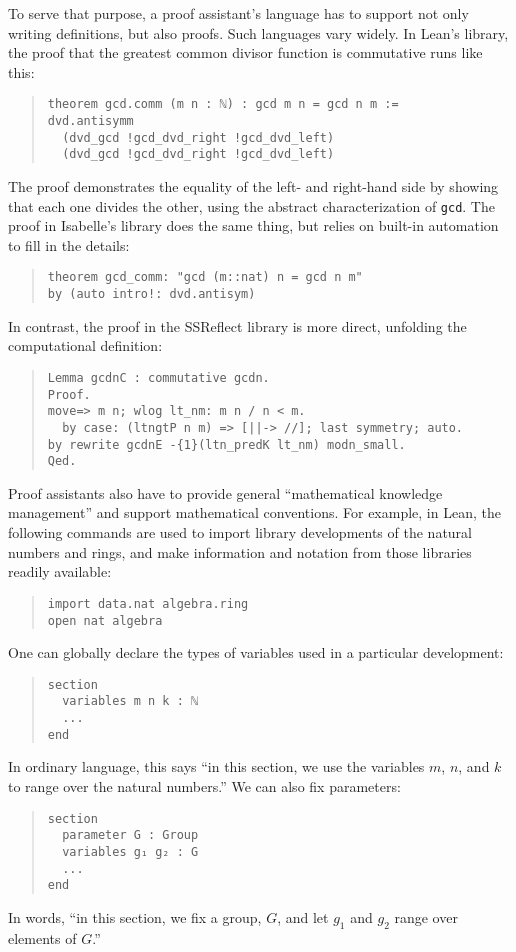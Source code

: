 \documentclass[12pt]{article}
\newcommand{\ttt}[1]{\texttt{#1}}
\begin{document}
To serve that purpose, a proof assistant's language has to support not only writing definitions, but also proofs. Such languages vary widely. In Lean's library, the proof that the greatest common divisor function is commutative runs like this:
\begin{quote}\begin{lstlisting}
theorem gcd.comm (m n : ℕ) : gcd m n = gcd n m :=
dvd.antisymm
  (dvd_gcd !gcd_dvd_right !gcd_dvd_left)
  (dvd_gcd !gcd_dvd_right !gcd_dvd_left) 
\end{lstlisting}\end{quote}
The proof demonstrates the equality of the left- and right-hand side by showing that each one divides the other, using the abstract characterization of \ttt{gcd}. The proof in Isabelle's library does the same thing, but relies on built-in automation to fill in the details:
\begin{quote}\begin{lstlisting}
theorem gcd_comm: "gcd (m::nat) n = gcd n m"
by (auto intro!: dvd.antisym) 
\end{lstlisting}\end{quote}
In contrast, the proof in the SSReflect library is more direct, unfolding the computational definition:
\begin{quote}\begin{lstlisting}
Lemma gcdnC : commutative gcdn.
Proof.
move=> m n; wlog lt_nm: m n / n < m.
  by case: (ltngtP n m) => [||-> //]; last symmetry; auto.
by rewrite gcdnE -{1}(ltn_predK lt_nm) modn_small.
Qed. 
\end{lstlisting}\end{quote}

Proof assistants also have to provide general ``mathematical knowledge management'' and support mathematical conventions. For example, in Lean, the following commands are used to import library developments of the natural numbers and rings, and make information and notation from those libraries readily available:
\begin{quote}\begin{lstlisting}
import data.nat algebra.ring
open nat algebra
\end{lstlisting}\end{quote}
One can globally declare the types of variables used in a particular development:
\begin{quote}\begin{lstlisting}
section
  variables m n k : ℕ
  ...
end
\end{lstlisting}\end{quote}
In ordinary language, this says ``in this section, we use the variables $m$, $n$, and $k$ to range over the natural numbers.'' We can also fix parameters:
\begin{quote}\begin{lstlisting}
section
  parameter G : Group
  variables g₁ g₂ : G
  ...
end
\end{lstlisting}\end{quote}
In words, ``in this section, we fix a group, $G$, and let $g_1$ and $g_2$ range over elements of $G$.''
\end{document}
